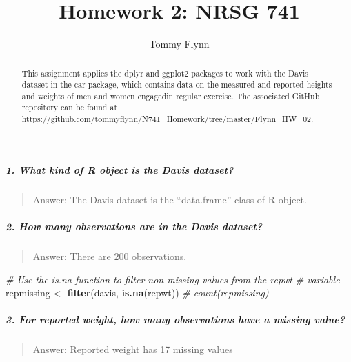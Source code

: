 \documentclass[]{elsarticle} %
\newenvironment{Shaded}{\begin{snugshade}}{\end{snugshade}}
\newcommand{\KeywordTok}[1]{\textcolor[rgb]{0.13,0.29,0.53}{\textbf{{#1}}}}
\newcommand{\StringTok}[1]{\textcolor[rgb]{0.31,0.60,0.02}{{#1}}}
\newcommand{\CommentTok}[1]{\textcolor[rgb]{0.56,0.35,0.01}{\textit{{#1}}}}
\newcommand{\NormalTok}[1]{{#1}}
\begin{document}
\begin{frontmatter}

  \title{Homework 2: NRSG 741}
    \author[Emory University]{Tommy Flynn}
      \address[Emory University]{Emory School of Nursing 1520 Clifton Rd Atlanta GA 30322}
  
  \begin{abstract}
  This assignment applies the dplyr and ggplot2 packages to work with the
  Davis dataset in the car package, which contains data on the measured
  and reported heights and weights of men and women engagedin regular
  exercise. The associated GitHub repository can be found at
  \url{https://github.com/tommyflynn/N741_Homework/tree/master/Flynn_HW_02}.
  \end{abstract}
  
 \end{frontmatter}

\subparagraph{1. What kind of R object is the Davis
dataset?}\label{what-kind-of-r-object-is-the-davis-dataset}

\begin{quote}
Answer: The Davis dataset is the ``data.frame'' class of R object.
\end{quote}

\subparagraph{2. How many observations are in the Davis
dataset?}\label{how-many-observations-are-in-the-davis-dataset}

\begin{quote}
Answer: There are 200 observations.
\end{quote}

\begin{Shaded}
\begin{Highlighting}[]
\CommentTok{# Use the is.na function to filter non-missing values from the repwt}
\CommentTok{# variable}
\NormalTok{repmissing <-}\StringTok{ }\KeywordTok{filter}\NormalTok{(davis, }\KeywordTok{is.na}\NormalTok{(repwt))}
\CommentTok{# count(repmissing)}
\end{Highlighting}
\end{Shaded}

\subparagraph{3. For reported weight, how many observations have a
missing
value?}\label{for-reported-weight-how-many-observations-have-a-missing-value}

\begin{quote}
Answer: Reported weight has 17 missing values
\end{quote}
\end{document}
